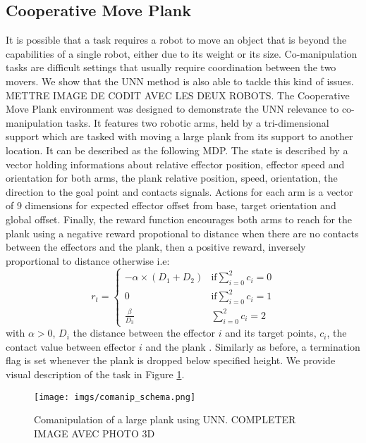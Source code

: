 \documentclass[letterpaper, 10 pt, conference]{ieeeconf}  %
\begin{document}
\subsection{Cooperative Move Plank} %
\label{ssub:cooperative_move_plank}

It is possible that a task requires a robot to move an object that is beyond the capabilities of a single robot, either due to its weight or its size. Co-manipulation tasks are difficult settings that usually require coordination between the two movers. We show that the UNN method is also able to tackle this kind of issues. \\
\uppercase{Mettre image de codit avec les deux robots}.  
The Cooperative Move Plank environment was designed to demonstrate the UNN relevance to co-manipulation tasks. It features two robotic arms, held by a tri-dimensional support which are tasked with moving a large plank from its support to another location. It can be described as the following MDP. The state is described by a vector holding informations about relative effector position, effector speed and orientation for both arms, the plank relative position, speed, orientation, the direction to the goal point and contacts signals. Actions for each arm is a vector of 9 dimensions for expected effector offset from base, target orientation and global offset. Finally, the reward function encourages both arms to reach for the plank using a negative reward propotional to distance when there are no contacts between the effectors and the plank, then a positive reward, inversely proportional to distance otherwise i.e:  
\[
r_t = \begin{cases}
  -\alpha \times (D_1 + D_2) & \text{if} \sum_{i = 0}^2 c_i = 0\\
  0 & \text{if} \sum_{i = 0}^2 c_i = 1 \\ 
  \frac{\beta}{D_3}  & \sum_{i = 0}^2 c_i = 2
\end{cases}
\]  with $\alpha > 0 $, $D_i$ the distance between the effector $i$ and its target points, $c_i$, the contact value between effector $i$ and the plank  . Similarly as before, a termination flag is set whenever the plank is dropped below specified height. We provide visual description of the task in Figure \ref{comanip_schema}. \\


\begin{figure}
\centering
\texttt{[image: imgs/comanip\_schema.png]}
\caption{Comanipulation of a large plank using UNN. COMPLETER IMAGE AVEC PHOTO 3D}
\label{comanip_schema}
\end{figure}
\end{document}
